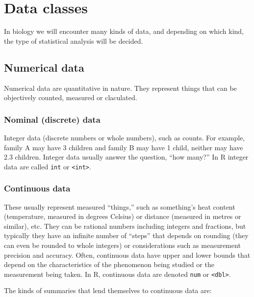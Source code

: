 \documentclass[english,10pt,a4paper,oneside]{book}
\theoremstyle{definition}
\theoremstyle{definition}
\theoremstyle{definition}
\theoremstyle{remark}
\begin{document}
\hypertarget{data-classes}{%
\section{Data classes}\label{data-classes}}

In biology we will encounter many kinds of data, and depending on which
kind, the type of statistical analysis will be decided.

\hypertarget{numerical-data}{%
\subsection{Numerical data}\label{numerical-data}}

Numerical data are quantitative in nature. They represent things that
can be objectively counted, measured or claculated.

\hypertarget{nominal-discrete-data}{%
\subsubsection{Nominal (discrete) data}\label{nominal-discrete-data}}

Integer data (discrete numbers or whole numbers), such as counts. For
example, family A may have 3 children and family B may have 1 child,
neither may have 2.3 children. Integer data usually answer the question,
\enquote{how many?} In R integer data are called \texttt{int} or
\texttt{\textless{}int\textgreater{}}.

\hypertarget{continuous-data}{%
\subsubsection{Continuous data}\label{continuous-data}}

These usually represent measured \enquote{things,} such as something's
heat content (temperature, measured in degrees Celsius) or distance
(measured in metres or similar), etc. They can be rational numbers
including integers and fractions, but typically they have an infinite
number of \enquote{steps} that depends on rounding (they can even be
rounded to whole integers) or considerations such as measurement
precision and accuracy. Often, continuous data have upper and lower
bounds that depend on the characteristics of the phenomenon being
studied or the measurement being taken. In R, continuous data are
denoted \texttt{num} or \texttt{\textless{}dbl\textgreater{}}.

The kinds of summaries that lend themselves to continuous data are:
\end{document}

